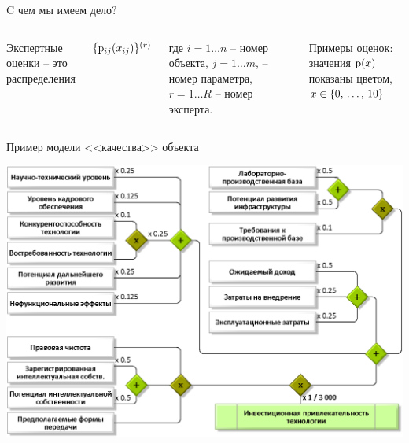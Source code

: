 \begin{frame}{C чем мы имеем дело?}
	\vspace*{3mm}
	\begin{columns}
		Экспертные оценки -- это распределения 
		{\large \begin{center} \hspace{-20mm}  $\{ {\mathrm{p}}_{ij}(x_{ij}) \}^{(r)}$ \end{center} }
		{\footnotesize где $i = 1 \ldots n$ -- номер объекта, $j = 1 \ldots m$, -- номер параметра, $r = 1 \ldots R$ -- номер эксперта}.  
		\begin{center}
			\vspace*{-8mm}
			  {\scriptsize {Примеры оценок: значения ${\mathrm{p}}(x)$ показаны цветом, $x \in \{0,\, \ldots,\, 10\}$}}
			  \\ \vspace*{2mm}
		\end{center}
	\end{columns}
 \end{frame} %

\begin{frame}{Пример модели <<качества>> объекта}
	\begin{center}
		\includegraphics[width=0.9\linewidth]{./pic/schemeF2}
	\end{center}
\end{frame} %

